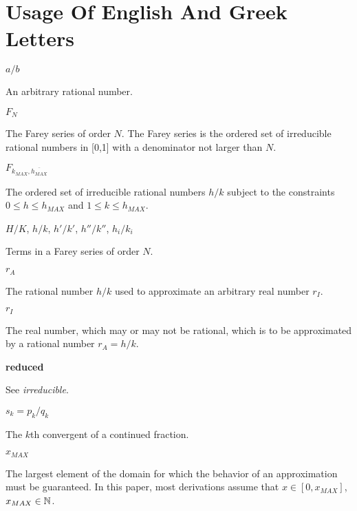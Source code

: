 
\section*{Usage Of English And Greek Letters}

\begin{vworkmathtermglossaryenum}

\item \mbox {\boldmath $a/b$}

      An arbitrary rational number.

\item \mbox {\boldmath $ F_N $}

      The Farey 
      series of order $N$.  The Farey series is the
      ordered set of irreducible rational numbers 
	  in [0,1] with a
      denominator not larger than $N$.

\item \mbox {\boldmath $F_{k_{MAX}, \overline{h_{MAX}}}$}
      
	  The ordered set of irreducible rational numbers
	  $h/k$ subject to the constraints $0 \leq h \leq h_{MAX}$
	  and $1 \leq k \leq h_{MAX}$.  


\item \mbox{\boldmath $H/K$}, \mbox{\boldmath $h/k$},
      \mbox{\boldmath $h'/k'$}, \mbox{\boldmath $h''/k''$},
      \mbox{\boldmath $h_i/k_i$}

      Terms in a Farey series of order $N$.

\item \mbox{\boldmath $r_A$}

      The rational number $h/k$ used to approximate
      an arbitrary real number $r_I$.

\item \mbox{\boldmath $r_I$}

      The real number, which may or may not be rational,
      which is to be approximated by a rational number
      $r_A = h/k$.

\item \textbf{reduced}

      See \emph{irreducible}.

\item \mbox{\boldmath $s_k = p_k/q_k$}

      The $k$th convergent of a continued fraction.

\item \mbox{\boldmath $x_{MAX}$}

      The largest element of the domain for which the
      behavior of an approximation must be guaranteed.
      In this paper, most derivations assume
      that $x \in [0, x_{MAX}]$, $x_{MAX} \in {\mathbb{N}}{}$.
\end{vworkmathtermglossaryenum}

